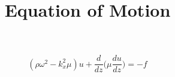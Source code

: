 \documentclass{memoir}
\begin{document}
\title{Equation of Motion}
\maketitle

$$(\rho\omega^2-k_x^2\mu)u+\frac{{d}}{{dz}}\bigg(\mu\frac{{du}}{{dz}}\bigg)= -f$$
\end{document}
